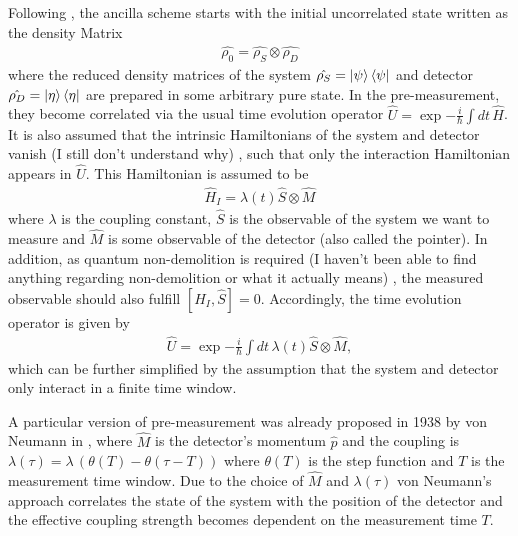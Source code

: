 \documentclass{article}
\newcommand\sj[1]{ {\color{orange} #1} }
\begin{document}
Following \cite{svenssonPedagogicalWeak2013}, the ancilla scheme starts with the initial uncorrelated 
state written as the density Matrix
\begin{align}
    \hat{\rho_0} =  \hat{\rho_S} \otimes  \hat{\rho_D}
\end{align}
where the reduced density matrices of the system $\hat{\rho_S} = \ket{\psi} \bra{\psi}$ and detector 
$\hat{\rho_D} = \ket{\eta} \bra{\eta}$ are prepared in some arbitrary pure state. In the pre-measurement, they 
become correlated via the usual time evolution operator $\hat{U} = \exp{ -\frac{i}{\hbar} \int dt \, \hat{H}}$. It is
also assumed that the intrinsic Hamiltonians of the system and detector vanish \cite{PreskillQuantum,svenssonPedagogicalWeak2013,tamirWeakMeasurements2013} 
\sj{(I still don't understand why)}, 
such that only the interaction Hamiltonian appears in $\hat{U}$. This Hamiltonian is assumed to be
\begin{align}
    \hat{H}_{I} = \lambda (t) \hat{S} \otimes \hat{M}
\end{align}
where $\lambda$ is the coupling constant, $\hat{S}$ is the observable of the system we want to measure and $\hat{M}$
is some observable of the detector (also called the pointer). In addition, as quantum non-demolition is required \cite{svenssonPedagogicalWeak2013} \sj{(I haven't been able to find anything regarding non-demolition or what it actually means)}, 
the measured observable should also fulfill $[\hat{H}_I, \hat{S}]=0$. Accordingly, the time evolution operator is given by 
\begin{align}
    \hat{U} = \exp{ -\frac{i}{\hbar} \int dt \,  \lambda (t) \hat{S}\otimes \hat{M} },
\end{align}
which can be further simplified by the assumption that the system and detector only interact in a 
finite time window. 

A particular version of pre-measurement was already proposed in 1938 by von Neumann in 
\cite{vonNeumannFoundationsQuantum2018}, where $\hat{M}$ is the detector's momentum $\hat{p}$ and the 
coupling is $\lambda (\tau) = \lambda \, (\theta (T) - \theta(\tau - T))$ where $\theta (T)$ is 
the step function and $T$ is the measurement time window. Due to the choice of $\hat{M}$ and $\lambda(\tau)$
von Neumann's approach correlates the state of the system with the position of the detector and the  effective coupling strength becomes dependent on the measurement time $T$. 
\end{document}
